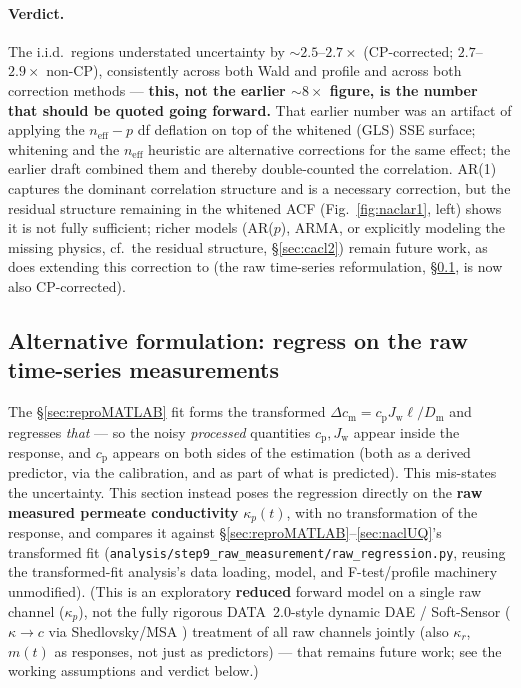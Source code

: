 \documentclass[11pt]{article}
\newcommand{\note}[1]{{\color{blue}\textsf{(#1)}}}
\newcommand{\Jw}{J_{\mathrm{w}}}
\newcommand{\Dm}{D_{\mathrm{m}}}
\newcommand{\cp}{c_{\mathrm{p}}}
\begin{document}
\paragraph{Verdict.} The i.i.d.\ regions understated uncertainty by
$\sim\!2.5$--$2.7\times$ (CP-corrected; $2.7$--$2.9\times$ non-CP), consistently
across both Wald and profile and across both correction methods --- \textbf{this,
not the earlier $\sim\!8\times$ figure, is the number that should be quoted
going forward.} That earlier
number was an artifact of applying the $n_{\mathrm{eff}}-p$ df deflation on
top of the whitened (GLS) SSE surface; whitening and the $n_{\mathrm{eff}}$
heuristic are alternative corrections for the same effect; the earlier draft
combined them and thereby double-counted the correlation. AR(1) captures the
dominant correlation structure and is a necessary correction, but the residual
structure remaining in the whitened ACF (Fig.~\ref{fig:naclar1}, left) shows
it is not fully sufficient; richer models (AR($p$), ARMA, or explicitly
modeling the missing physics, cf.\ the  residual structure,
\S\ref{sec:cacl2}) remain future work, as does extending this correction to
 (the raw time-series reformulation, \S\ref{sec:altform}, is now
also CP-corrected).

\subsection{Alternative formulation: regress on the raw time-series measurements}\label{sec:altform}
The \S\ref{sec:reproMATLAB} fit forms the transformed
$\Delta c_{\mathrm m}=\cp\Jw\ell/\Dm$ and regresses \emph{that} --- so the noisy
\emph{processed} quantities $\cp,\Jw$ appear inside the response, and $\cp$
appears on both sides of the estimation (both as a derived predictor, via the
calibration, and as part of what is predicted). This mis-states the
uncertainty. This section instead poses the regression directly on the
\textbf{raw measured permeate conductivity} $\kappa_p(t)$, with no
transformation of the response, and compares it against
\S\ref{sec:reproMATLAB}--\ref{sec:naclUQ}'s transformed fit
(\texttt{analysis/step9\_raw\_measurement/raw\_regression.py}, reusing the
transformed-fit analysis's data loading, model, and F-test/profile machinery
unmodified).
\note{This is an exploratory \textbf{reduced} forward model on a single raw
channel ($\kappa_p$), not the fully rigorous DATA~2.0-style dynamic DAE /
Soft-Sensor ($\kappa\!\to\!c$ via Shedlovsky/MSA \cite{lilonfe2025softsensors})
treatment of all raw channels jointly (also $\kappa_r$, $m(t)$ as responses,
not just as predictors) --- that remains future work; see the working
assumptions and verdict below.}
\end{document}
